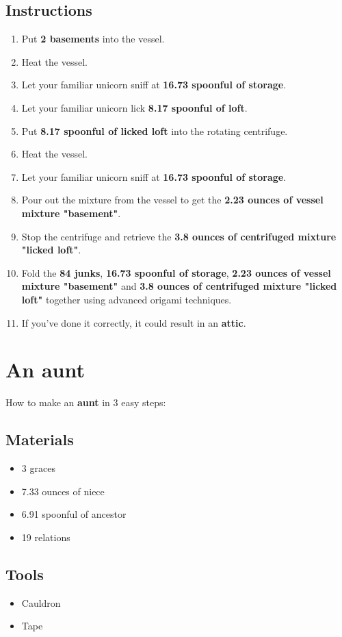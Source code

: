 \documentclass{article}
\begin{document}
\subsection{Instructions}\begin{enumerate}
\item 
Put \textbf{2 basements} into the vessel.
\item 
Heat the vessel.
\item 
Let your familiar unicorn sniff at \textbf{16.73 spoonful of storage}.
\item 
Let your familiar unicorn lick \textbf{8.17 spoonful of loft}.
\item 
Put \textbf{8.17 spoonful of licked loft} into the rotating centrifuge.
\item 
Heat the vessel.
\item 
Let your familiar unicorn sniff at \textbf{16.73 spoonful of storage}.
\item 
Pour out the mixture from the vessel to get the \textbf{2.23 ounces of vessel mixture "basement"}.
\item 
Stop the centrifuge and retrieve the \textbf{3.8 ounces of centrifuged mixture "licked loft"}.
\item 
Fold the \textbf{84 junks}, \textbf{16.73 spoonful of storage}, \textbf{2.23 ounces of vessel mixture "basement"} and \textbf{3.8 ounces of centrifuged mixture "licked loft"} together using advanced origami techniques.
\item 
If you've done it correctly, it could result in an \textbf{attic}.
\end{enumerate}
\newpage
\section{An aunt}How to make an \textbf{aunt} in 3 easy steps:

\subsection{Materials}\begin{itemize}
\item 
3 graces
\item 
7.33 ounces of niece
\item 
6.91 spoonful of ancestor
\item 
19 relations
\end{itemize}
\subsection{Tools}\begin{itemize}
\item 
Cauldron
\item 
Tape
\end{itemize}
\end{document}
